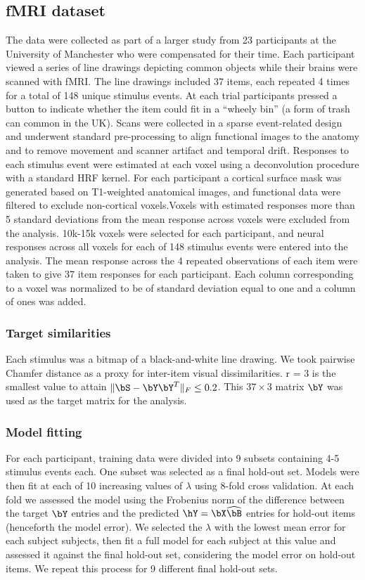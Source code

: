 \subsection{fMRI dataset} The data were collected as part of a larger study from 23 participants at the University of Manchester who were compensated for their time. Each participant viewed a series of line drawings depicting common objects while their brains were scanned with fMRI. The line drawings included 37 items, each repeated 4 times for a total of 148 unique stimulus events. At each trial participants pressed a button to indicate whether the item could fit in a ``wheely bin'' (a form of trash can common in the UK).
Scans were collected in a sparse event-related design and underwent standard pre-processing to align functional images to the anatomy and to remove movement and scanner artifact and temporal drift. Responses to each stimulus event were estimated at each voxel using a deconvolution procedure with a standard HRF kernel. For each participant a cortical surface mask was generated based on T1-weighted anatomical images, and functional data were filtered to exclude non-cortical voxels.Voxels with estimated responses more than 5 standard deviations from the mean response across voxels were excluded from the analysis. 10k-15k voxels were selected for each participant, and neural responses across all voxels for each of 148 stimulus events were entered into the analysis. The mean response across the 4 repeated observations of each item were taken to give 37 item responses for each participant. Each column corresponding to a voxel was normalized to be of standard deviation equal to one and a column of ones was added.

\subsubsection*{Target similarities}
 Each stimulus was a bitmap of a black-and-white line drawing. We took pairwise Chamfer distance as a proxy for inter-item visual dissimilarities. r = 3 is the smallest value to attain $\|\bS - \bY\bY^T\|_F \leq 0.2$. This $37 \times 3$ matrix $\bY$ was used as the target matrix for the analysis.

\subsubsection*{Model fitting}
For each participant, training data were divided into 9 subsets containing 4-5 stimulus events each. One subset was selected as a final hold-out set. Models were then fit at each of 10 increasing values of $\lambda$ using 8-fold cross validation. At each fold we assessed the model using the Frobenius norm of the difference between the target $\bY$ entries and the predicted $\hY = \bX\widehat{\bB}$ entries for hold-out items (henceforth the model error). We selected the $\lambda$ with the lowest mean error for each subject subjects, then fit a full model for each subject at this value and assessed it against the final hold-out set, considering the model error on hold-out items. We repeat this process for 9 different final hold-out sets.

